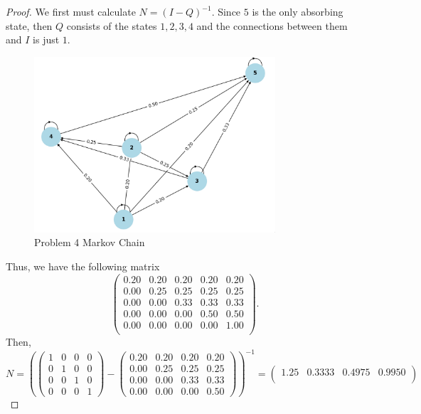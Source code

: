 \documentclass[a4paper]{article}
\begin{document}
\begin{enumerate}
\begin{proof}
  We first must calculate $N = (I-Q)^{-1}$. Since $5$ is the only absorbing state, then $Q$ consists of the states  $1,2,3,4$ and the connections between them and  $I$ is just  $1$.
 
\begin{figure}[h]
  \centering
  \includegraphics[width=0.8\textwidth]{assets/markov_chain_absorption.png}
  \caption{Problem 4 Markov Chain}
  \label{fig:markov_chain_absorption}
\end{figure}
Thus, we have the following matrix
\[
\begin{pmatrix}
0.20 & 0.20 & 0.20 & 0.20 & 0.20 \\
0.00 & 0.25 & 0.25 & 0.25 & 0.25 \\
0.00 & 0.00 & 0.33 & 0.33 & 0.33 \\
0.00 & 0.00 & 0.00 & 0.50 & 0.50 \\
0.00 & 0.00 & 0.00 & 0.00 & 1.00 \\
\end{pmatrix}
.\]
Then,
\[
N =  (\begin{pmatrix}
1 & 0 & 0 & 0 \\
0 & 1 & 0 & 0 \\
0 & 0 & 1 & 0 \\
0 & 0 & 0 & 1 
\end{pmatrix}  - \begin{pmatrix}
0.20 & 0.20 & 0.20 & 0.20 \\
0.00 & 0.25 & 0.25 & 0.25 \\
0.00 & 0.00 & 0.33 & 0.33 \\
0.00 & 0.00 & 0.00 & 0.50 
\end{pmatrix})^{-1} =  \begin{pmatrix}
1.25 & 0.3333 & 0.4975 & 0.9950 \\

\end{pmatrix}\]
\end{proof}
\end{enumerate}
\end{document}
